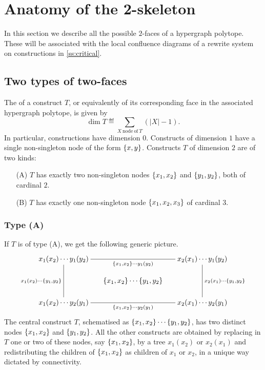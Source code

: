
\section{Anatomy of the 2-skeleton} 
\label{s:anatomy}

In this section we describe all the possible $2$-faces of a hypergraph polytope.
These will be associated with the local confluence diagrams of a rewrite system on constructions in \cref{ss:critical}.


\subsection{Two types of two-faces} 
\label{two-types}
The  of a construct $T$, or equivalently of its corresponding face in the associated hypergraph polytope, is given by
$$\dim T \eqdef \sum_{X\:\mathrm{node\: of}\: T}(|X|-1).$$
In particular, constructions have dimension $0$. 
Constructs of dimension $1$ have a single non-singleton node of the form $\left\{x,y\right\}$. 
Constructs $T$ of dimension $2$ are of two kinds:
\begin{itemize}
\item[(A)]  $T$ has exactly two non-singleton nodes $\left\{x_1,x_2\right\}$ and $\left\{y_1,y_2\right\}$, both of cardinal $2$. 
\item[(B)] $T$ has exactly one non-singleton node $\left\{x_1,x_2,x_3\right\}$ of cardinal $3$.
\end{itemize}

\subsubsection*{Type (A)}
\label{ss:typeA}
If $T$ is of type (A), we get the following generic picture.
$$ 
\xymatrix @-1.65pc { x_1(x_2)\cdots y_1(y_2) \ar @{-}[dddd]_{x_1(x_2)\cdots \set{y_1,y_2}} 
 \ar @{-}[rrrr]_{\set{x_1,x_2}\cdots y_1(y_2)} &&&& x_2(x_1)\cdots y_1(y_2) \ar @{-}[dddd]^{x_2(x_1)\cdots \set{y_1,y_2}} \\
 &&&&\\
 && \set{x_1,x_2} \cdots \set{y_1,y_2}&&\\
 &&&&\\
 x_1(x_2)\cdots y_2(y_1)  \ar @{-}[rrrr]_{\set{x_1,x_2}\cdots y_2(y_1)} &&  && x_2(x_1)\cdots y_2(y_1)}
 $$
The central construct $T$, schematised as $\left\{x_1,x_2\right\} \cdots \left\{y_1,y_2\right\}$, has two distinct nodes $\left\{x_1,x_2\right\}$ and $\left\{y_1,y_2\right\}$. 
All the other constructs are obtained by replacing in $T$ one or two of these nodes, say $\left\{x_1,x_2\right\}$, by a  tree $x_1(x_2)$ or $x_2(x_1)$ and redistributing the children of  $\left\{x_1,x_2\right\}$  as children of  $x_1$ or $x_2$, in a unique way dictated by connectivity. 

